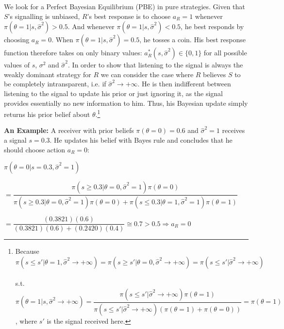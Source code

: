 \documentclass[paper=a4,12pt,DIV=11,twoside=false]{scrartcl}
\begin{document}
\noindent We look for a Perfect Bayesian Equilibrium (PBE) in pure strategies. Given that $S$'s signalling is unbiased, $R$'s best response is to choose $a_R=1$ whenever $\pi(\theta=1|s, \hat{\sigma}^2) > 0.5$. And whenever $\pi(\theta=1|s, \hat{\sigma}^2) < 0.5$, he best responds by choosing $a_R=0$. When $\pi(\theta=1|s, \hat{\sigma}^2) = 0.5$, he tosses a coin. His best response function therefore takes on only binary values: $a_{R}^{*}(s,\hat{\sigma}^2)\in \{0,1\}$ for all possible values of $s$, $\sigma^2$ and $\hat{\sigma}^2$. In order to show that listening to the signal is always the weakly dominant strategy for $R$ we can consider the case where $R$ believes $S$ to be completely intransparent, i.e. if $\hat{\sigma}^2 \to +\infty$. He is then indifferent between listening to the signal to update his prior or just ignoring it, as the signal provides essentially no new information to him. Thus, his Bayesian update simply returns his prior belief about $\theta$.\footnote{Because $\pi(s \leq s'|\theta=1, \hat{\sigma}^2 \to +\infty) = \pi(s \geq s'|\theta=0, \hat{\sigma}^2 \to +\infty)=\pi(s \leq s'|\hat{\sigma}^2 \to +\infty)$ \\ \\s.t.  $\pi(\theta=1|s, \hat{\sigma}^2 \to +\infty) = \dfrac{\pi(s \leq s'|\hat{\sigma}^2 \to +\infty)\pi(\theta=1)}{\pi(s \leq s'|\hat{\sigma}^2 \to +\infty)(\pi(\theta=1)+\pi(\theta=0))}= \pi(\theta=1)$, where $s'$ is the signal received here.}

\noindent \textbf{An Example:} A receiver with prior beliefs $\pi(\theta = 0)=0.6$ and $\hat{\sigma}^2 = 1$ receives a signal $s=0.3$. He updates his belief with Bayes rule and concludes that he should choose action $a_{R}=0$:

\begin{center}
$\pi(\theta = 0|s = 0.3,\hat{\sigma}^2=1)$ 
\end{center}

\begin{center}
$= \dfrac{\pi(s \geq 0.3 | \theta = 0,\hat{\sigma}^2=1)\pi(\theta = 0)}{\pi(s \geq 0.3 | \theta = 0,\hat{\sigma}^2=1)\pi(\theta = 0) + \pi(s \leq 0.3 | \theta = 1,\hat{\sigma}^2=1)\pi(\theta = 1)}$
\end{center}

\begin{center}
$=\dfrac{(0.3821)(0.6)}{(0.3821)(0.6)+(0.2420)(0.4)}\cong 0.7 > 0.5 \Rightarrow a_{R}=0$
\end{center}
\end{document}
